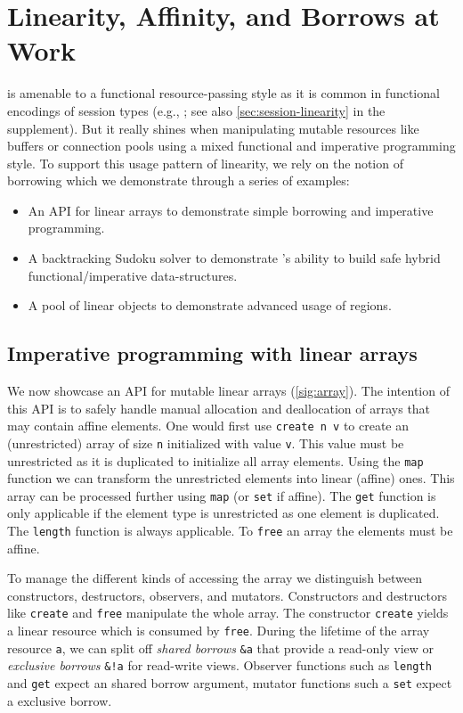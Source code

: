 \section{Linearity, Affinity, and Borrows at Work}
\label{motivation}

\lang{} is amenable to a functional resource-passing style as it is
common in functional encodings of session types (e.g.,
\cite{DBLP:journals/jfp/Padovani17}; see also
\cref{sec:session-linearity} in the supplement). But it really shines 
when manipulating mutable resources like buffers or connection pools
using a mixed functional and imperative programming style.
%
To support this usage pattern of linearity, we rely on
the notion of borrowing \cite{DBLP:conf/popl/BoylandR05} which
we demonstrate through a series of examples:
\begin{itemize}
\item An API for linear arrays to demonstrate simple borrowing and imperative programming.
\item
  A backtracking Sudoku solver to demonstrate
  \lang's ability to build safe hybrid functional/imperative data-structures.
\item A pool of linear objects to demonstrate advanced usage of regions.
\end{itemize}

\subsection{Imperative programming with linear arrays}
\label{sec:imper-progr}

We now showcase an API for mutable linear arrays
(\cref{sig:array}).
The intention of this API is to safely handle manual allocation and
deallocation of arrays that may contain affine elements.
One would first use \lstinline/create n v/ to create
an (unrestricted) array of size \lstinline/n/ initialized with value
\lstinline/v/. This value must be unrestricted as it is duplicated to
initialize all array elements. Using the \lstinline/map/ function we
can transform the unrestricted elements into linear (affine)
ones. This array can be processed further using \lstinline/map/ (or \lstinline/set/ if
affine). The \lstinline/get/ function is only applicable if the element type
is unrestricted as one element is duplicated. The \lstinline/length/
function is always applicable. To \lstinline/free/ an array the elements must be
affine.

To manage the different kinds of accessing the array we distinguish between constructors, destructors,
observers, and mutators.
Constructors and destructors like \lstinline/create/ and \lstinline/free/ manipulate the whole
array. %
The constructor
\lstinline/create/ yields a linear resource which is consumed by \lstinline/free/.
During the lifetime of the array resource \lstinline/a/, we can split
off \emph{shared borrows} \lstinline/&a/ that provide a read-only
view or \emph{exclusive borrows} \lstinline/&!a/ for read-write views.
Observer functions such as \lstinline/length/ and \lstinline/get/ expect an shared borrow
argument, mutator functions such a \lstinline/set/ expect
a exclusive borrow.

